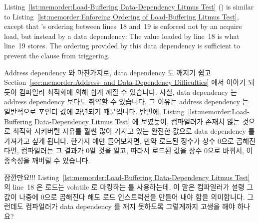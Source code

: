 Listing~\ref{lst:memorder:Load-Buffering Data-Dependency Litmus Test}
()
is similar to
Listing~\ref{lst:memorder:Enforcing Ordering of Load-Buffering Litmus Test},
except that 's ordering between lines~18 and~19 is
enforced not by an acquire load, but instead by a data dependency:
The value loaded by line~18 is what line~19 stores.
The ordering provided by this data dependency is sufficient to prevent
the  clause from triggering.
\fi

Address dependency 와 마찬가지로, data dependency 도 깨지기 쉽고
Section~\ref{sec:memorder:Address- and Data-Dependency Difficulties} 에서
이야기 되듯이 컴파일러 최적화에 의해 쉽게 깨질 수 있습니다.
사실, data dependency 는 address dependency 보다도 취약할 수 있습니다.
그 이유는 address dependency 는 일반적으로 포인터 값에 과년되기 때문입니다.
반면에,
Listing~\ref{lst:memorder:Load-Buffering Data-Dependency Litmus Test}
에 보였듯이, 컴파일러가 존재치 않는 것으로 최적화 시켜버릴 자유를 훨씬 많이
가지고 있는 완전한 값으로 data dependency 를 가져가고 싶게 됩니다.
한가지 예만 들어보자면, 만약 로드된 정수가 상수 0으로 곱해진다면, 컴파일러는 그
결과가 0일 것을 알고, 따라서 로드된 값을 상수 0으로 바꿔서, 이 종속성을 깨버릴
수 있습니다.

\QuickQuiz{}
	잠깐만요!!!
	Listing~\ref{lst:memorder:Load-Buffering Data-Dependency Litmus Test}
	의 line~18 은 로드는 volatile 로 마킹하는  를
	사용하는데, 이 말은 컴파일러가 설령 그 값이 나중에 0으로 곱해진다 해도
	로드 인스트럭션을 만들어 내야 함을 의미합니다.
	그런데도 컴파일러가 data dependency 를 깨지 못하도록 그렇게까지 고생을
	해야 하나요?
	\iffalse

